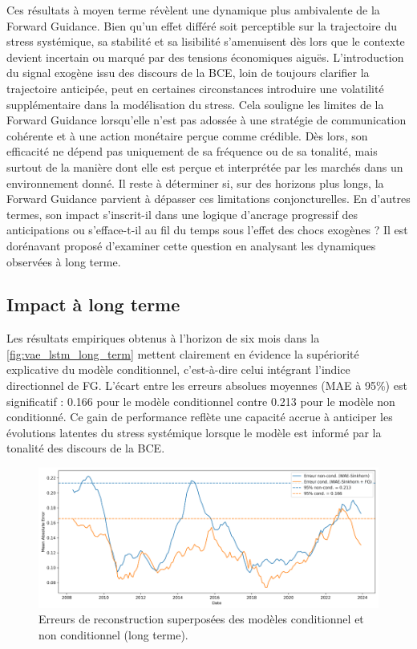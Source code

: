 Ces résultats à moyen terme révèlent une dynamique plus ambivalente de la Forward Guidance. Bien qu’un effet différé soit perceptible sur la trajectoire du stress systémique, sa stabilité et sa lisibilité s’amenuisent dès lors que le contexte devient incertain ou marqué par des tensions économiques aiguës. L’introduction du signal exogène issu des discours de la BCE, loin de toujours clarifier la trajectoire anticipée, peut en certaines circonstances introduire une volatilité supplémentaire dans la modélisation du stress. Cela souligne les limites de la Forward Guidance lorsqu’elle n’est pas adossée à une stratégie de communication cohérente et à une action monétaire perçue comme crédible. Dès lors, son efficacité ne dépend pas uniquement de sa fréquence ou de sa tonalité, mais surtout de la manière dont elle est perçue et interprétée par les marchés dans un environnement donné. Il reste à déterminer si, sur des horizons plus longs, la Forward Guidance parvient à dépasser ces limitations conjoncturelles. En d'autres termes, son impact s’inscrit-il dans une logique d’ancrage progressif des anticipations ou s’efface-t-il au fil du temps sous l’effet des chocs exogènes ? Il est dorénavant proposé d’examiner cette question en analysant les dynamiques observées à long terme.

\newpage

\subsection{Impact à long terme}

Les résultats empiriques obtenus à l’horizon de six mois dans la \autoref{fig:vae_lstm_long_term} mettent clairement en évidence la supériorité explicative du modèle conditionnel, c’est-à-dire celui intégrant l’indice directionnel de FG. L’écart entre les erreurs absolues moyennes (MAE à 95\%) est significatif : 0.166 pour le modèle conditionnel contre 0.213 pour le modèle non conditionné. Ce gain de performance reflète une capacité accrue à anticiper les évolutions latentes du stress systémique lorsque le modèle est informé par la tonalité des discours de la BCE.

\begin{figure}[H]
    \centering
    \includegraphics[width=0.9\linewidth]{images/results_lt.png}
    \caption{Erreurs de reconstruction superposées des modèles conditionnel et non conditionnel (long terme).}
    \label{fig:vae_lstm_long_term}
\end{figure}

